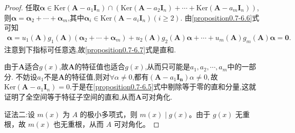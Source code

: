 \documentclass[../../main.tex]{subfiles}
\begin{document}
\begin{proof}
任取\(\boldsymbol{\alpha}\in \mathrm{Ker}(\boldsymbol{A}-a_1\boldsymbol{I}_n)\cap(\mathrm{Ker}(\boldsymbol{A}-a_2\boldsymbol{I}_n)+\cdots+\mathrm{Ker}(\boldsymbol{A}-a_m\boldsymbol{I}_n))\), 则\(\boldsymbol{\alpha} = \boldsymbol{\alpha}_2+\cdots+\boldsymbol{\alpha}_m\),其中\(\boldsymbol{\alpha}_i\in \mathrm{Ker}(\boldsymbol{A} - a_i\boldsymbol{I}_n)(i\geqslant  2)\). 由\eqref{proposition0.7-6.6}式可知
\begin{align*}
\boldsymbol{\alpha} = u_1(\boldsymbol{A})g_1(\boldsymbol{A})(\boldsymbol{\alpha}_2 + \cdots + \boldsymbol{\alpha}_m) + u_2(\boldsymbol{A})g_2(\boldsymbol{A})\boldsymbol{\alpha} + \cdots + u_m(\boldsymbol{A})g_m(\boldsymbol{A})\boldsymbol{\alpha} = \boldsymbol{0}.
\end{align*}
注意到下指标可任意选,故\eqref{proposition0.7-6.7}式是直和.

由于\(\boldsymbol{A}\)适合\(g(x)\),故\(\boldsymbol{A}\)的特征值也适合\(g(x)\),从而只可能是\(a_1,a_2,\cdots,a_m\)中的一部分. 
不妨设$a_1$不是$\boldsymbol{A}$的特征值,则对$\forall \alpha\ne 0$,都有$(\boldsymbol{A}-a_1\boldsymbol{I_n})\alpha \ne 0,$故$\mathrm{Ker}(\boldsymbol{A} - a_1\boldsymbol{I}_n)=0$.于是在\eqref{proposition0.7-6.5}式中剔除等于零的直和分量,这就证明了全空间等于特征子空间的直和,从而\(\boldsymbol{A}\)可对角化.

{\color{blue}证法二:}设 $m(x)$ 为 $A$ 的极小多项式，则 $m(x)\mid g(x)$。由于 $g(x)$ 无重根，故 $m(x)$ 也无重根，从而 $A$ 可对角化。
\end{proof}
\end{document}
